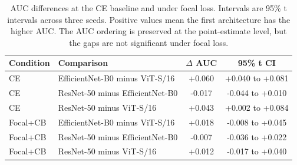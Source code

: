 \begin{table}[t]
\centering
\small
\caption{AUC differences at the CE baseline and under focal loss. Intervals are 95\% t intervals across three seeds. Positive values mean the first architecture has the higher AUC. The AUC ordering is preserved at the point-estimate level, but the gaps are not significant under focal loss.}
\label{tab:auctests}
\begin{tabular}{llcc}
\toprule
Condition & Comparison & $\Delta$ AUC & 95\% t CI \\
\midrule
CE & EfficientNet-B0 minus ViT-S/16 & +0.060 & +0.040 to +0.081 \\
CE & ResNet-50 minus EfficientNet-B0 & -0.017 & -0.044 to +0.010 \\
CE & ResNet-50 minus ViT-S/16 & +0.043 & +0.002 to +0.084 \\
\midrule
Focal+CB & EfficientNet-B0 minus ViT-S/16 & +0.018 & -0.008 to +0.045 \\
Focal+CB & ResNet-50 minus EfficientNet-B0 & -0.007 & -0.036 to +0.022 \\
Focal+CB & ResNet-50 minus ViT-S/16 & +0.012 & -0.017 to +0.040 \\
\bottomrule
\end{tabular}
\end{table}

